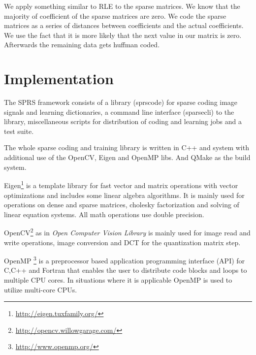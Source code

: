 We apply something similar to RLE to the sparse matrices. We know that the
majority of coefficient of the sparse matrices are zero. We code the sparse
matrices as a series of distances between coefficients and the actual
coefficients. We use the fact that it is more likely that the next value in our
matrix is zero. Afterwards the remaining data gets huffman coded.




\section{Implementation}
The SPRS framework consists of a library (sprscode) for sparse coding image
signals and learning dictionaries, a command line interface (sparsecli) to the
library, miscellaneous scripts for distribution of coding and learning jobs
and a test suite.

The whole sparse coding and training library is written in C++ and system with
additional use of the OpenCV, Eigen and OpenMP libs. And QMake as the build
system. 

Eigen\footnote{\url{http://eigen.tuxfamily.org/}}
is a template library for fast vector and matrix operations with vector
optimizations and includes some linear algebra algorithms. It is mainly used for
operations on dense and sparse matrices, cholesky factorization and solving of
linear equation systems. All math operations use double precision. 

OpenCV\footnote{\url{http://opencv.willowgarage.com/}} as
in \emph{Open Computer Vision Library} is mainly used for
image read and write operations, image conversion and DCT for the
quantization matrix step. 

OpenMP \footnote{\url{http://www.openmp.org/}} is a preprocessor
based application programming interface (API) for C,C++ and Fortran that enables
the user to distribute code blocks and loops to multiple CPU cores. In
situations where it is applicable OpenMP is used to utilize multi-core CPUs. 



